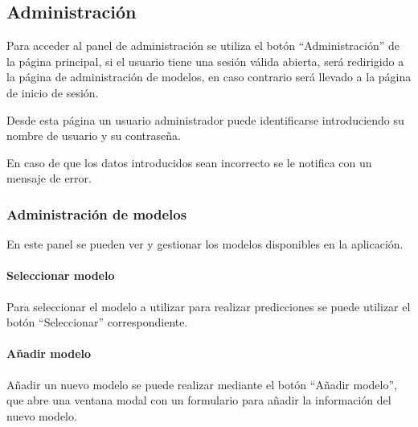 \subsection{Administración}

Para acceder al panel de administración se utiliza el botón ``Administración''
de la página principal, si el usuario tiene una sesión válida abierta, será
redirigido a la página de administración de modelos, en caso contrario será
llevado a la página de inicio de sesión.


Desde esta página un usuario administrador puede identificarse introduciendo su
nombre de usuario y su contraseña.

En caso de que los datos introducidos sean incorrecto se le notifica con un
mensaje de error.


\subsubsection{Administración de modelos}

En este panel se pueden ver y gestionar los modelos disponibles en la
aplicación.

\paragraph{Seleccionar modelo}

Para seleccionar el modelo a utilizar para realizar predicciones se puede
utilizar el botón ``Seleccionar'' correspondiente.


\paragraph{Añadir modelo}

Añadir un nuevo modelo se puede realizar mediante el botón ``Añadir modelo'',
que abre una ventana modal con un formulario para añadir la información del
nuevo modelo.
